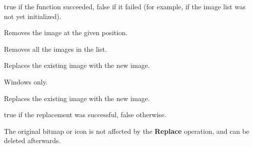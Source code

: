
true if the function succeeded, false if it failed (for example, if the image
list was not yet initialized).

\label{wximagelistremove}


Removes the image at the given position.

\label{wximagelistremoveall}


Removes all the images in the list.

\label{wximagelistreplace}


Replaces the existing image with the new image.

Windows only.


Replaces the existing image with the new image.






true if the replacement was successful, false otherwise.


The original bitmap or icon is not affected by the {\bf Replace} operation, and can be deleted afterwards.



